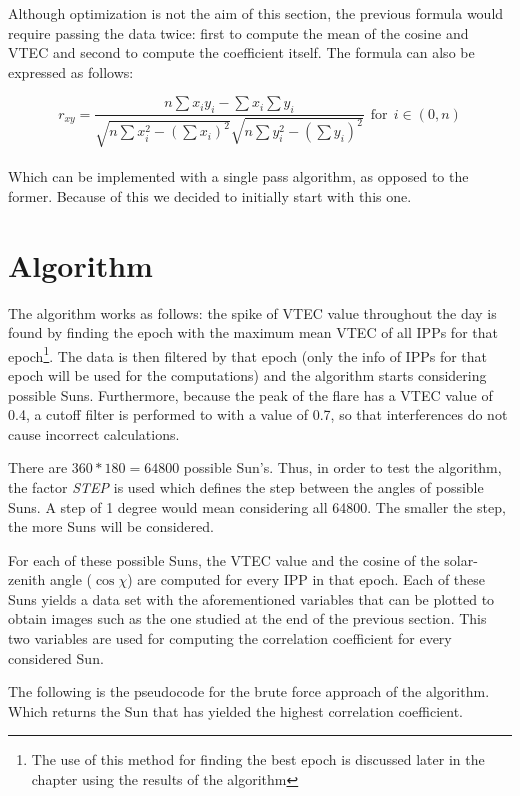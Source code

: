 Although optimization is not the aim of this section, the previous formula would require passing the data twice: first to compute the mean of the cosine and VTEC and second to compute the coefficient itself. The formula can also be expressed as follows:

\begin{equation} \label{eq:singlePass}
r_{xy} = \frac{n\sum x_{i}y_{i} - \sum x_{i}\sum y_{i}}
{\sqrt{n\sum x_{i}^{2} - (\sum x_{i})^{2}}
	\sqrt{n\sum y_{i}^{2} - (\sum y_{i})^{2}}}  \ \ \text{for} \ \ i \in (0, n)
\end{equation} \\

Which can be implemented with a single pass algorithm, as opposed to the former. Because of this we decided to initially start with this one.

\section{Algorithm}

The algorithm works as follows: the spike of VTEC value throughout the day is found by finding the epoch with the maximum mean VTEC of all IPPs for that epoch\footnote{The use of this method for finding the best epoch is discussed later in the chapter using the results of the algorithm}.
The data is then filtered by that epoch (only the info of IPPs for that epoch will be used for the computations) and the algorithm starts considering possible Suns. Furthermore, because the peak of the flare has a VTEC value of 0.4, a cutoff filter is performed to with a value of 0.7, so that interferences do not cause incorrect calculations.

There are $360 * 180 = 64800$ possible Sun's. Thus, in order to test the algorithm, the factor \textit{STEP} is used which defines the step between the angles of possible Suns. A step of 1 degree would mean considering all 64800. The smaller the step, the more Suns will be considered. 

For each of these possible Suns, the VTEC value and the cosine of the solar-zenith angle ($\cos \chi$) are computed for every IPP in that epoch. Each of these Suns yields a data set with the aforementioned variables that can be plotted to obtain images such as the one studied at the end of the previous section. This two variables are used for computing the correlation coefficient for every considered Sun.

The following is the pseudocode for the brute force approach of the algorithm. Which returns the Sun that has yielded the highest correlation coefficient.


